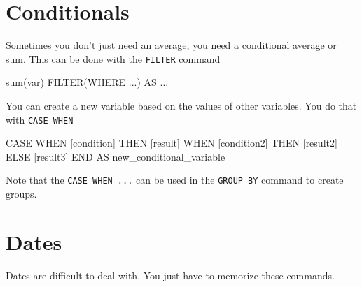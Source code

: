 \documentclass[
  letterpaper,
  DIV=11,
  numbers=noendperiod]{scrreprt}
\newenvironment{Shaded}{\begin{snugshade}}{\end{snugshade}}
\newcommand{\ControlFlowTok}[1]{\textcolor[rgb]{0.00,0.23,0.31}{#1}}
\newcommand{\FunctionTok}[1]{\textcolor[rgb]{0.28,0.35,0.67}{#1}}
\newcommand{\KeywordTok}[1]{\textcolor[rgb]{0.00,0.23,0.31}{#1}}
\newcommand{\NormalTok}[1]{\textcolor[rgb]{0.00,0.23,0.31}{#1}}
\newcommand{\OperatorTok}[1]{\textcolor[rgb]{0.37,0.37,0.37}{#1}}
\begin{document}
\hypertarget{conditionals}{%
\section{Conditionals}\label{conditionals}}

Sometimes you don't just need an average, you need a conditional average
or sum. This can be done with the \texttt{FILTER} command

\begin{Shaded}
\begin{Highlighting}[]
\FunctionTok{sum}\NormalTok{(var) }\KeywordTok{FILTER}\NormalTok{(}\KeywordTok{WHERE} \OperatorTok{..}\NormalTok{.) }\KeywordTok{AS} \OperatorTok{..}\NormalTok{.}
\end{Highlighting}
\end{Shaded}

You can create a new variable based on the values of other variables.
You do that with \texttt{CASE\ WHEN}

\begin{Shaded}
\begin{Highlighting}[]
\ControlFlowTok{CASE} 
  \ControlFlowTok{WHEN}\NormalTok{ [condition] }\ControlFlowTok{THEN}\NormalTok{ [result]}
  \ControlFlowTok{WHEN}\NormalTok{ [condition2] }\ControlFlowTok{THEN}\NormalTok{ [result2]}
  \ControlFlowTok{ELSE}\NormalTok{ [result3] }\ControlFlowTok{END} \KeywordTok{AS}\NormalTok{ new\_conditional\_variable  }
\end{Highlighting}
\end{Shaded}

Note that the \texttt{CASE\ WHEN\ ...} can be used in the
\texttt{GROUP\ BY} command to create groups.

\hypertarget{dates}{%
\section{Dates}\label{dates}}

Dates are difficult to deal with. You just have to memorize these
commands.
\end{document}
